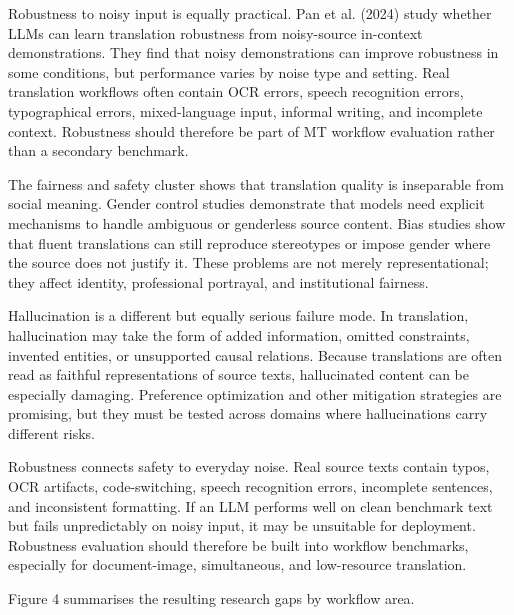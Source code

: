 \documentclass[11pt]{article}
\begin{document}
Robustness to noisy input is equally practical. Pan et al. (2024) study whether LLMs can learn translation robustness from noisy-source in-context demonstrations. They find that noisy demonstrations can improve robustness in some conditions, but performance varies by noise type and setting. Real translation workflows often contain OCR errors, speech recognition errors, typographical errors, mixed-language input, informal writing, and incomplete context. Robustness should therefore be part of MT workflow evaluation rather than a secondary benchmark.


The fairness and safety cluster shows that translation quality is inseparable from social meaning. Gender control studies demonstrate that models need explicit mechanisms to handle ambiguous or genderless source content. Bias studies show that fluent translations can still reproduce stereotypes or impose gender where the source does not justify it. These problems are not merely representational; they affect identity, professional portrayal, and institutional fairness.

Hallucination is a different but equally serious failure mode. In translation, hallucination may take the form of added information, omitted constraints, invented entities, or unsupported causal relations. Because translations are often read as faithful representations of source texts, hallucinated content can be especially damaging. Preference optimization and other mitigation strategies are promising, but they must be tested across domains where hallucinations carry different risks.

Robustness connects safety to everyday noise. Real source texts contain typos, OCR artifacts, code-switching, speech recognition errors, incomplete sentences, and inconsistent formatting. If an LLM performs well on clean benchmark text but fails unpredictably on noisy input, it may be unsuitable for deployment. Robustness evaluation should therefore be built into workflow benchmarks, especially for document-image, simultaneous, and low-resource translation.

Figure 4 summarises the resulting research gaps by workflow area.
\end{document}
